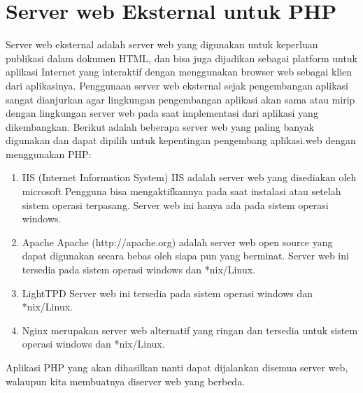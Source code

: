 \section{Server web Eksternal untuk PHP}
Server web eksternal adalah server web yang digunakan untuk keperluan publikasi dalam dokumen HTML, dan bisa juga dijadikan sebagai platform untuk aplikasi Internet yang interaktif dengan menggunakan browser web sebagai klien dari aplikasinya. Penggunaan server web eksternal sejak pengembangan aplikasi sangat dianjurkan agar lingkungan pengembangan aplikasi akan sama atau mirip dengan lingkungan server web pada saat implementasi dari aplikasi yang dikembangkan. Berikut adalah beberapa server web yang paling banyak digunakan dan dapat dipilih untuk kepentingan pengembang aplikasi.web dengan menggunakan PHP:
\begin{enumerate}
\item IIS (Internet Information System)
IIS adalah server web yang disediakan oleh microsoft Pengguna bisa mengaktifkannya pada saat instalasi atau setelah sistem operasi terpasang. Server web ini hanya ada pada sistem operasi windows.

\item Apache
Apache (http://apache.org) adalah server web open source yang dapat digunakan secara bebas oleh siapa pun yang berminat. Server web ini tersedia pada sistem operasi windows dan *nix/Linux.

\item LightTPD
Server web ini tersedia pada sistem operasi windows dan *nix/Linux.
  
\item Nginx
merupakan server web alternatif yang ringan dan tersedia untuk sistem operasi windows dan *nix/Linux.
\end {enumerate}

Aplikasi PHP yang akan dihasilkan nanti dapat dijalankan disemua server web, walaupun kita membuatnya diserver web yang berbeda.